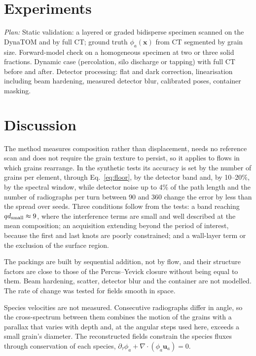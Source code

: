 \documentclass[11pt]{article}
\newcommand{\plan}[1]{\textcolor{blue!60!black}{\textit{Plan:} #1}}
\newcommand{\x}{\bm{x}}
\begin{document}
\section{Experiments}\label{sec:experiments}

\plan{Static validation: a layered or graded bidisperse specimen scanned on
the DynaTOM and by full CT; ground truth $\phi_a(\x)$ from CT segmented by
grain size. Forward-model check on a homogeneous specimen at two or three
solid fractions. Dynamic case (percolation, silo discharge or tapping) with
full CT before and after. Detector processing: flat and dark correction,
linearisation including beam hardening, measured detector blur, calibrated
poses, container masking.}

\section{Discussion}

The method measures composition rather than displacement, needs no reference
scan and does not require the grain texture to persist, so it applies to
flows in which grains rearrange. In the synthetic tests its accuracy is set
by the number of grains per element, through Eq.~\eqref{eq:floor}, by the
detector band and, by 10--20\%, by the spectral window, while detector noise up to 4\% of the path length and
the number of radiographs per turn between 90 and 360 change the error by
less than the spread over seeds. Three conditions follow from the tests: a
band reaching $qd_{\rm small}\approx9$, where the interference terms are
small and well described at the mean composition; an acquisition extending
beyond the period of interest, because the first and last knots are poorly
constrained; and a wall-layer term or the exclusion of the surface region.

The packings are built by sequential addition, not by flow, and their
structure factors are close to those of the Percus--Yevick closure without
being equal to them. Beam hardening, scatter, detector blur and the
container are not modelled. The rate of change was tested for fields smooth
in space.

Species velocities are not measured. Consecutive radiographs differ in
angle, so the cross-spectrum between them combines the motion of the grains
with a parallax that varies with depth and, at the angular steps used here,
exceeds a small grain's diameter. The reconstructed fields constrain the
species fluxes through conservation of each species,
$\partial_\tau\phi_a+\nabla\cdot(\phi_a\bm u_a)=0$.
\end{document}
